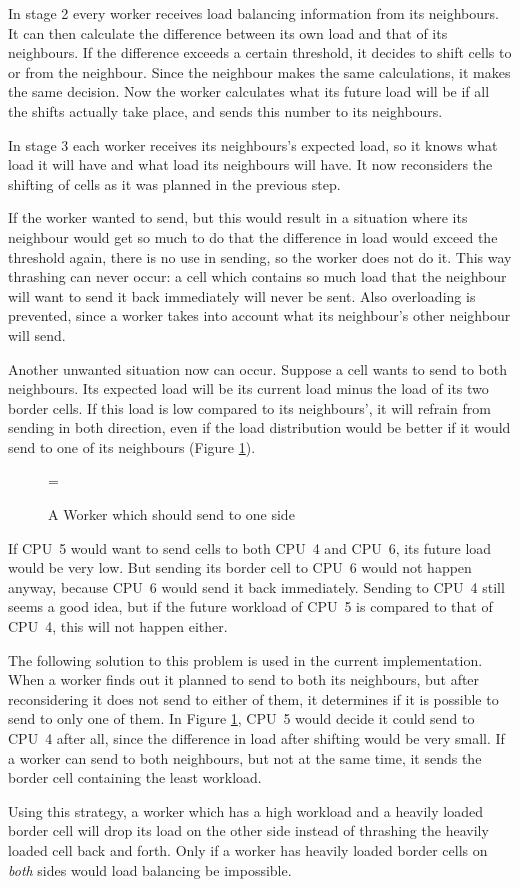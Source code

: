 In stage 2 every worker receives load balancing information from its
neighbours. It can then calculate the difference between its own load
and that of its neighbours. If the difference exceeds a certain threshold, it
decides to shift cells to or from the neighbour. Since the neighbour
makes the same calculations, it makes the same decision.
Now the worker calculates what its future load will be if all the shifts
actually take place, and sends this number to its neighbours.

In stage 3 each worker receives its neighbours's expected load, so it
knows what load it will have and what load its neighbours will have. It
now reconsiders the shifting of cells as it was planned in the previous
step.

If the worker wanted to send, but this would result in a situation where
its neighbour would get so much to do that the difference in load would
exceed the threshold again, there is no use in sending, so the worker
does not do it. This way thrashing can never occur: a cell which
contains so much load that the neighbour will want to send it back
immediately will never be sent. Also overloading is prevented, since a
worker takes into account what its neighbour's other neighbour will
send.

Another unwanted situation now can occur. Suppose a cell wants to send
to both neighbours. Its expected load will be its current load minus
the load of its two border cells. If this load is low compared to its
neighbours', it will refrain from sending in both direction, even if
the load distribution would be better if it would send to one of its
neighbours (Figure \ref{fSendOne}).

\begin{figure}
\epsfxsize=\textwidth
{}
\caption{A Worker which should send to one side}
\label{fSendOne}
\end{figure}

If CPU~5 would want to send cells to both CPU~4 and CPU~6, its future
load would be very low. But sending its border cell to CPU~6 would not
happen anyway, because CPU~6 would send it back immediately. Sending to
CPU~4 still seems a good idea, but if the future workload of CPU~5 is
compared to that of CPU~4, this will not happen either.

The following solution to this problem is used in the current
implementation. When a worker
finds out it planned to send to both its neighbours, but after
reconsidering it does not send to either of them, it determines if it
is possible to send to only one of them. In Figure \ref{fSendOne}, CPU~5
would decide it could send to CPU~4 after all, since the difference in
load after shifting would be very small. If a worker can send to
both neighbours, but not at the same time, it sends the border cell
containing the least workload.

Using this strategy, a worker which has a high workload and a heavily
loaded border cell will drop its load on the other side instead of
thrashing the heavily loaded cell back and forth. Only if
a worker has heavily loaded border cells on {\em both} sides would load
balancing be impossible.

